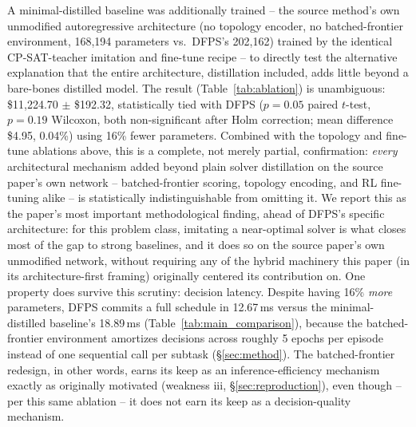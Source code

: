 \documentclass[journal]{IEEEtran}
\begin{document}
A minimal-distilled baseline was additionally trained -- the source method's own unmodified autoregressive architecture (no topology encoder, no batched-frontier environment, 168{,}194 parameters vs.\ DFPS's 202{,}162) trained by the identical CP-SAT-teacher imitation and fine-tune recipe -- to directly test the alternative explanation that the entire architecture, distillation included, adds little beyond a bare-bones distilled model. The result (Table~\ref{tab:ablation}) is unambiguous: \$11{,}224.70 $\pm$ \$192.32, statistically tied with DFPS ($p=0.05$ paired $t$-test, $p=0.19$ Wilcoxon, both non-significant after Holm correction; mean difference \$4.95, 0.04\%) using 16\% fewer parameters. Combined with the topology and fine-tune ablations above, this is a complete, not merely partial, confirmation: \emph{every} architectural mechanism added beyond plain solver distillation on the source paper's own network -- batched-frontier scoring, topology encoding, and RL fine-tuning alike -- is statistically indistinguishable from omitting it. We report this as the paper's most important methodological finding, ahead of DFPS's specific architecture: for this problem class, imitating a near-optimal solver is what closes most of the gap to strong baselines, and it does so on the source paper's own unmodified network, without requiring any of the hybrid machinery this paper (in its architecture-first framing) originally centered its contribution on. One property does survive this scrutiny: decision latency. Despite having 16\% \emph{more} parameters, DFPS commits a full schedule in 12.67\,ms versus the minimal-distilled baseline's 18.89\,ms (Table~\ref{tab:main_comparison}), because the batched-frontier environment amortizes decisions across roughly 5 epochs per episode instead of one sequential call per subtask (\S\ref{sec:method}). The batched-frontier redesign, in other words, earns its keep as an inference-efficiency mechanism exactly as originally motivated (weakness iii, \S\ref{sec:reproduction}), even though -- per this same ablation -- it does not earn its keep as a decision-quality mechanism.
\end{document}
